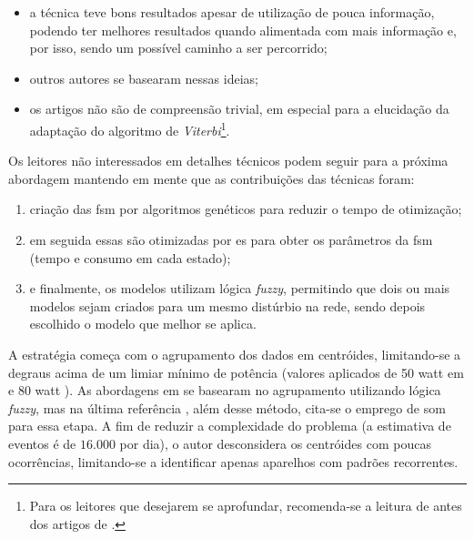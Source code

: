 \begin{enumerate}[label=\textbf{1.\arabic*},wide=\parindent]
\begin{enumerate}[label*=.\textbf{\arabic*},wide=\parindent]
\begin{itemize}[wide=\parindent]
\begin{itemize}
\item a técnica teve bons resultados apesar de utilização de pouca
informação, podendo ter melhores resultados quando alimentada com mais
informação e, por isso, sendo um possível caminho a ser percorrido;
\item outros autores \cite{nilm_bergman_distribuido_2011,
nilm_zeifman_vast_2011,nilm_zeifman_vast_hisample_pdfmerge_2011,
nilm_zeifman_vastext_approach_2012,
nilm_zeifman_statistical_vastext_1stws_2012,
nilm_zeifman_statistical_naive_enduses_2013} se basearam nessas
ideias;
\item os artigos não são de compreensão trivial, em especial para a
elucidação da adaptação do algoritmo de \emph{Viterbi}\footnote{Para os
leitores que desejarem se aprofundar, recomenda-se a leitura de
\cite{nilm_bergman_distribuido_2011} antes dos artigos de
\citeauthor*{nilm_baranski_genetic_detalhado_2004_20}.}. 
\end{itemize}

Os leitores não interessados em detalhes técnicos podem
seguir para a próxima abordagem mantendo em mente que as contribuições
das técnicas foram: 

\begin{enumerate}
\item criação das \gls{fsm} por algoritmos genéticos
para reduzir o tempo de otimização; 
\item em seguida essas são otimizadas por \gls{es} para obter os
parâmetros da \gls{fsm} (tempo e consumo em cada estado); 
\item e finalmente, os modelos utilizam lógica \emph{fuzzy}, permitindo que
dois ou mais modelos sejam criados para um mesmo distúrbio na rede,
sendo depois escolhido o modelo que melhor se aplica.
\end{enumerate}

A estratégia começa com o agrupamento dos dados em centróides,
limitando-se a degraus acima de um limiar mínimo de potência (valores
aplicados de 50 \acs{watt} em
\cite{nilm_baranski_genetic_base_2003_19} e 80 \acs{watt}
\cite{nilm_baranski_genetic_detalhado_2004_20}). As abordagens em
\cite{nilm_baranski_genetic_base_2003_19,
nilm_baranski_genetic_detalhado_2004_20} se basearam no agrupamento
utilizando lógica \emph{fuzzy}, mas na última referência
\cite{nilm_baranski_summary_2004_21}, além desse método, cita-se o
emprego de \gls{som} para essa etapa. A fim de reduzir a complexidade
do problema (a estimativa de eventos é de $16.000$ por dia), o autor
desconsidera os centróides com poucas ocorrências, limitando-se a
identificar apenas aparelhos com padrões recorrentes. 


\end{itemize}
\end{enumerate}
\end{enumerate}
